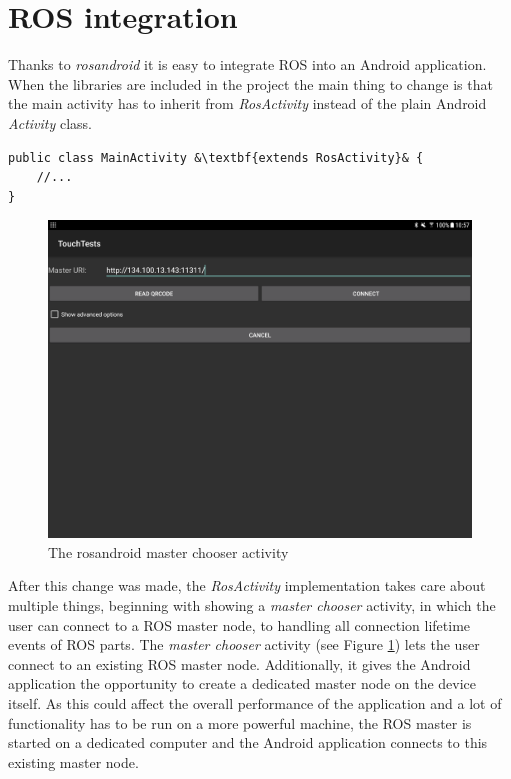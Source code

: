 \section{ROS integration}

Thanks to \textit{rosandroid} it is easy to integrate ROS into an Android application. When the libraries are included in the project the main thing to change is that the main activity has to inherit from \textit{RosActivity} instead of the plain Android \textit{Activity} class.

\begin{lstlisting}[caption={Changes to MainActivity}, escapechar=&]
public class MainActivity &\textbf{extends RosActivity}& {
	//...
}
\end{lstlisting}

\begin{figure}
\caption{\label{fig:impl:masterchooser}The rosandroid master chooser activity}
\includegraphics[width=\linewidth]{assets/chpt_impl/masterchooser}	
\end{figure}

After this change was made, the \textit{RosActivity} implementation takes care about multiple things, beginning with showing a \textit{master chooser}  activity, in which the user can connect to a ROS master node, to handling all connection lifetime events of ROS parts. The \textit{master chooser} activity (see Figure \ref{fig:impl:masterchooser}) lets the user connect to an existing ROS master node. Additionally, it gives the Android application the opportunity to create a dedicated master node on the device itself. As this could affect the overall performance of the application and a lot of functionality has to be run on a more powerful machine, the ROS master is started on a dedicated computer and the Android application connects to this existing master node.

